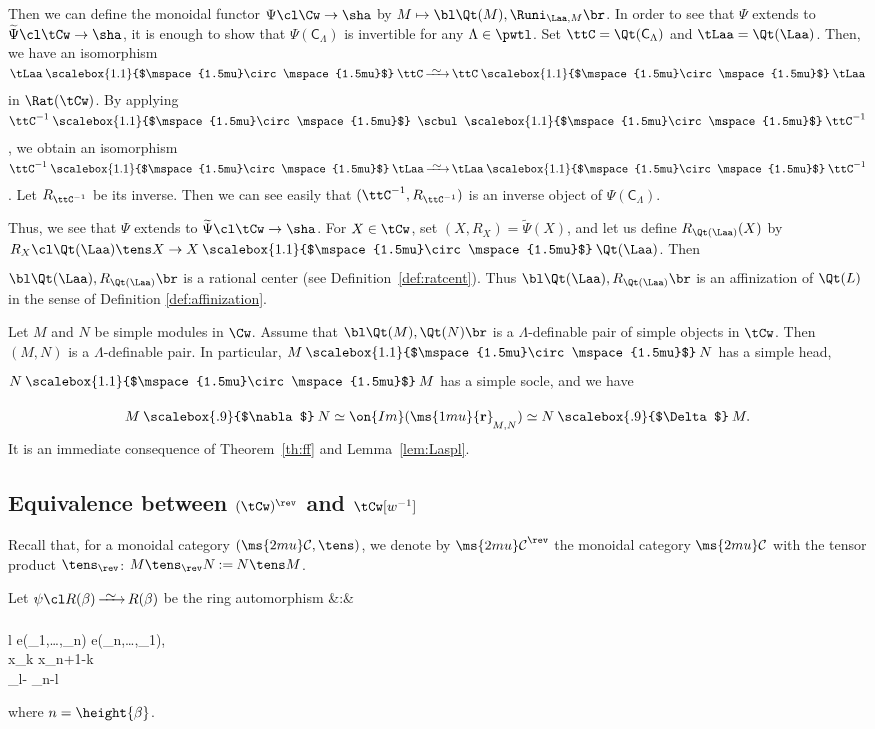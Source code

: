 \documentclass[12pt,leqno]{amsart}%
\renewcommand{\le}{\leqslant}
\theoremstyle{plain}
\theoremstyle{definition}
\newcommand{\seteq}{\mathbin{:=}}
\newcommand{\isoto}[1][]{\mathop{\xrightarrow%
[{\raisebox{.3ex}[0ex][.3ex]{$\scriptstyle{#1}$}}]%
{{\raisebox{-.6ex}[0ex][-.6ex]{$\mspace{5mu}\sim\mspace{5mu}$}}}}}
\newcommand{\conv}[1][]{
\underset{\raisebox{.5ex}{$\scriptstyle{#1}$}}{\mathbin{\scalebox{1.1}{$\mspace{1.5mu}\circ\mspace{1.5mu}$}}}}
\newcommand{\hconv}{\mathbin{\scalebox{.9}{$\nabla$}}}
\newcommand{\sconv}{\mathbin{\scalebox{.9}{$\Delta$}}}
\renewcommand{\Im}{\on{Im}}
\newcommand{\dC}{ \mathsf{C }}              %
\newcommand{\La}{\Lambda} 			%
\newcommand{\rmat}[1]{\ms{1mu}{\mathbf{r}}_%
{\mspace{-2mu}\raisebox{-.6ex}{${\scriptstyle{#1}}$}}}
\newcommand{\shc}{{\ms{2mu}\mathcal{C}}}
\newenvironment{myarray}[1]{\relax\setlength{\arraycolsep}{1pt}
\renewcommand{\arraystretch}{1.2}%
\begin{array}{#1}}{\end{array}\relax}
\newcommand{\ba}{\begin{myarray}}
\newcommand{\ea}{\end{myarray}}
\numberwithin{equation}{section}
\begin{document}
Then we can define
the monoidal functor $\Psi\cl\Cw\to \sha$ by
$M\mapsto \bl\Qt(M),\Runi_{\Laa,M}\br$.
In order to see that $\Psi$ extends to $\widetilde\Psi\cl \tCw\to\sha$,
it is enough to show that $\Psi(\dC_\La)$ is invertible for any $\La\in\pwtl$.
Set $\ttC=\Qt(\dC_\La)$ and $\tLaa=\Qt(\Laa)$.
Then, we have an isomorphism
$\tLaa\conv\ttC\isoto\ttC\conv\tLaa$ in $\Rat(\tCw)$.
By applying $\ttC^{-1}\conv\;\scbul\;\conv\ttC^{-1}$, we obtain
an isomorphism
$\ttC^{-1}\conv\tLaa\isoto\tLaa\conv\ttC^{-1}$.
Let $R_{\ttC^{-1}}$ be its inverse.
Then we can see easily that $(\ttC^{-1},R_{\ttC^{-1}})$ is an inverse object
of $\Psi(\dC_\La)$.

Thus, we see that  $\Psi$ extends to $\widetilde\Psi\cl \tCw\to\sha$.
For $X\in\tCw$, set $(X,R_X)=\widetilde\Psi(X)$, and
let us define $R_{\Qt(\Laa)}(X)$ by  $R_X\cl\Qt(\Laa)\tens X\to X\conv\Qt(\Laa)$.
Then $\bl\Qt(\Laa),R_{\Qt(\Laa)}\br$ is a rational center
(see Definition~\ref{def:ratcent}).
Thus $\bl\Qt(\Laa),R_{\Qt(\Laa)}\br$ is an affinization of $\Qt(L)$
in the sense of
Definition \ref{def:affinization}.
\QED

\Prop\label{prop:shsw}
Let $M$ and $N$ be simple modules in $\Cw$.
Assume that $\bl\Qt(M),\Qt(N)\br$ is a $\La$-definable pair of simple objects in $\tCw$.
Then $(M,N)$ is a $\La$-definable pair.
In particular, $M\conv N$ has a simple head, $N\conv M$ has a simple socle,
and we have
$$M\hconv N\simeq\Im(\rmat{M,N})\simeq N\sconv M.$$
\enprop
\Proof
It is an immediate consequence of
 Theorem~\ref{th:ff} and  Lemma~\ref{lem:Laspl}.
\QED



%
\subsection{Equivalence between $(\tCw)^{\rev}$ and $\tCw[{w^{-1}}]$}







Recall that, for a monoidal category $(\shc,\tens)$, we denote by $\shc^\rev$
the monoidal category $\shc$ with the tensor product $\tens_\rev$: $M\tens_\rev N\seteq N\tens M$.


Let $\psi\cl R(\beta)\isoto R(\beta)$ be the ring automorphism
\eq \label{eq:psi}
\psi&\;:\hs{2ex}&\ba{l}
e(\nu_1,\ldots ,\nu_n) \mapsto e(\nu_n,\ldots ,\nu_1), \\
 x_k \mapsto x_{n+1-k} \qt{($1\le k\le n$),}\\
\tau_l\mapsto -  \tau_{n-l}\qt{($1\le l<n$),}
\ea\label{def:antipsi}
\eneq
 where $n=\height{\beta}$.
\end{document}
